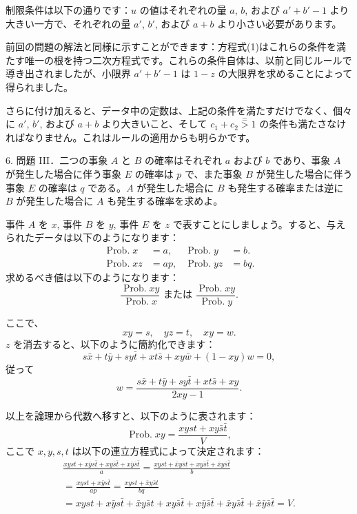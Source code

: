 \documentclass[a4paper,11pt,openany]{ltjsbook}
\begin{document}
制限条件は以下の通りです：$u$ の値はそれぞれの量 $a$, $b$, および $a' + b'-1$ より大きい一方で、それぞれの量 $a'$, $b'$, および $a + b$ より小さい必要があります。

前回の問題の解法と同様に示すことができます：方程式(1)はこれらの条件を満たす唯一の根を持つ二次方程式です。これらの条件自体は、以前と同じルールで導き出されましたが、小限界 $a' + b'-1$ は $1-z$ の大限界を求めることによって得られました。

さらに付け加えると、データ中の定数は、上記の条件を満たすだけでなく、個々に $a'$, $b'$, および $a + b$ より大きいこと、そして $c_1 + c_2 \stackrel{=}{>} 1$ の条件も満たさなければなりません。これはルールの適用からも明らかです。

6. 問題 III．二つの事象 \( A \) と \( B \) の確率はそれぞれ \( a \) および \( b \) であり、事象 \( A \) が発生した場合に伴う事象 \( E \) の確率は \( p \) で、また事象 \( B \) が発生した場合に伴う事象 \( E \) の確率は \( q \) である。\( A \) が発生した場合に \( B \) も発生する確率または逆に \( B \) が発生した場合に \( A \) も発生する確率を求めよ。

事件 \( A \) を \( x \), 事件 \( B \) を \( y \), 事件 \( E \) を \( z \) で表すことにしましょう。すると、与えられたデータは以下のようになります：
\begin{align*}
\operatorname{Prob. } x & = a, & \operatorname{Prob. } y & = b. \\
\operatorname{Prob. } xz & = ap, & \operatorname{Prob. } yz & = bq.
\end{align*}
求めるべき値は以下のようになります：
\[
\frac{\operatorname{Prob. } xy}{\operatorname{Prob. } x} \text{ または } \frac{\operatorname{Prob. } xy}{\operatorname{Prob. } y}.
\]

ここで、
\[
xy = s, \quad yz = t, \quad xy = w.
\]
\( z \) を消去すると、以下のように簡約化できます：
\[
s \bar{x} + t \bar{y} + sy \bar{t} + xt \bar{s} + xy \bar{w} + (1 - xy)w = 0,
\]
従って
\[
w = \frac{s \bar{x} + t \bar{y} + sy \bar{t} + xt \bar{s} + xy}{2xy - 1}.
\]

以上を論理から代数へ移すと、以下のように表されます：
\[
\operatorname{Prob. } xy = \frac{xyst + xy \bar{s} \bar{t}}{V},
\]
ここで \( x, y, s, t \) は以下の連立方程式によって決定されます：
\begin{gather*}
\frac{xyst + x \bar{y} s \bar{t} + xy \bar{s} \bar{t} + x \bar{y} \bar{s} \bar{t}}{a} = \frac{xyst + \bar{x} y \bar{s} t + xy \bar{s} \bar{t} + \bar{x} y \bar{s} \bar{t}}{b} \\
= \frac{xyst + x \bar{y} s \bar{t}}{ap} = \frac{xyst + \bar{x} y \bar{s} t}{bq} \\
= xyst + x \bar{y} s \bar{t} + \bar{x} y \bar{s} t + xy \bar{s} \bar{t} + x \bar{y} \bar{s} \bar{t} + \bar{x} y \bar{s} \bar{t} + \bar{x} \bar{y} \bar{s} \bar{t} = V.
\end{gather*}
\end{document}
